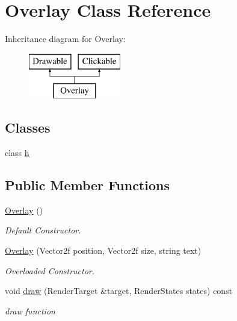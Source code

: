\hypertarget{class_overlay}{}\section{Overlay Class Reference}
\label{class_overlay}
Inheritance diagram for Overlay\+:\begin{figure}[H]
\begin{center}
\leavevmode
\includegraphics[height=2.000000cm]{class_overlay}
\end{center}
\end{figure}
\subsection*{Classes}
\begin{DoxyCompactItemize}
\item 
class \hyperlink{class_overlay_1_1h}{h}
\end{DoxyCompactItemize}
\subsection*{Public Member Functions}
\begin{DoxyCompactItemize}
\item 
\hyperlink{class_overlay_ab4f509d502931bcaad03418470993d70}{Overlay} ()
\begin{DoxyCompactList}\small\item\em Default Constructor. \end{DoxyCompactList}\item 
\hyperlink{class_overlay_a6cd84b6dc4fdcb2a6fbfafaf5e63e170}{Overlay} (Vector2f position, Vector2f size, string text)
\begin{DoxyCompactList}\small\item\em Overloaded Constructor. \end{DoxyCompactList}\item 
void \hyperlink{class_overlay_abe32d7e0e71733150f7a28cf3e851aa1}{draw} (Render\+Target \&target, Render\+States states) const
\begin{DoxyCompactList}\small\item\em draw function \end{DoxyCompactList}\end{DoxyCompactItemize}
